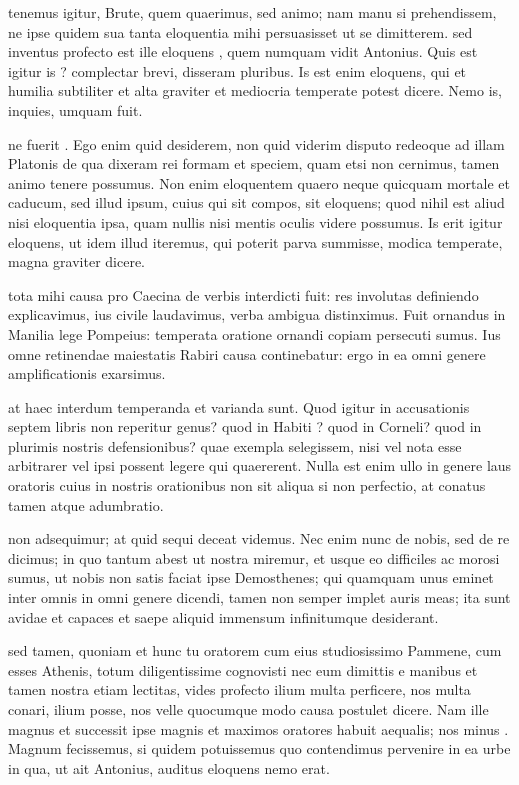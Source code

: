  tenemus igitur, Brute, quem quaerimus, sed animo; nam manu si prehendissem, ne ipse quidem sua tanta eloquentia mihi persuasisset ut se dimitterem. sed inventus profecto est ille eloquens , quem numquam vidit Antonius. Quis est igitur is ? complectar brevi, disseram pluribus. Is est enim eloquens, qui et humilia subtiliter et alta graviter et mediocria temperate potest dicere. Nemo is, inquies, umquam fuit.

 ne fuerit . Ego enim quid desiderem, non quid viderim disputo redeoque ad illam Platonis de qua dixeram rei formam et speciem, quam etsi non cernimus, tamen animo tenere possumus. Non enim eloquentem quaero neque quicquam mortale et caducum, sed illud ipsum, cuius qui sit compos, sit eloquens; quod nihil est aliud nisi eloquentia ipsa, quam nullis nisi mentis oculis videre possumus. Is erit igitur eloquens, ut idem illud iteremus, qui poterit parva summisse, modica temperate, magna graviter dicere.

 tota mihi causa pro Caecina de verbis interdicti fuit: res involutas definiendo explicavimus, ius civile laudavimus, verba ambigua distinximus. Fuit ornandus in Manilia lege Pompeius: temperata oratione ornandi copiam persecuti sumus. Ius omne retinendae maiestatis Rabiri causa continebatur: ergo in ea omni genere amplificationis exarsimus.

 at haec interdum temperanda et varianda sunt. Quod igitur in accusationis septem libris non reperitur genus? quod in Habiti ? quod in Corneli? quod in plurimis nostris defensionibus? quae exempla selegissem, nisi vel nota esse arbitrarer vel ipsi possent legere qui quaererent. Nulla est enim ullo in genere laus oratoris cuius in nostris orationibus non sit aliqua si non perfectio, at conatus tamen atque adumbratio.

 non adsequimur; at quid sequi deceat videmus. Nec enim nunc de nobis, sed de re dicimus; in quo tantum abest ut nostra miremur, et usque eo difficiles ac morosi sumus, ut nobis non satis faciat ipse Demosthenes; qui quamquam unus eminet inter omnis in omni genere dicendi, tamen non semper implet auris meas; ita sunt avidae et capaces et saepe aliquid immensum infinitumque desiderant.

 sed tamen, quoniam et hunc tu oratorem cum eius studiosissimo Pammene, cum esses Athenis, totum diligentissime cognovisti nec eum dimittis e manibus et tamen nostra etiam lectitas, vides profecto ilium multa perficere, nos multa conari, ilium posse, nos velle quocumque modo causa postulet dicere. Nam ille magnus et successit ipse magnis et maximos oratores habuit aequalis; nos minus . Magnum fecissemus, si quidem potuissemus quo contendimus pervenire in ea urbe in qua, ut ait Antonius, auditus eloquens nemo erat.

